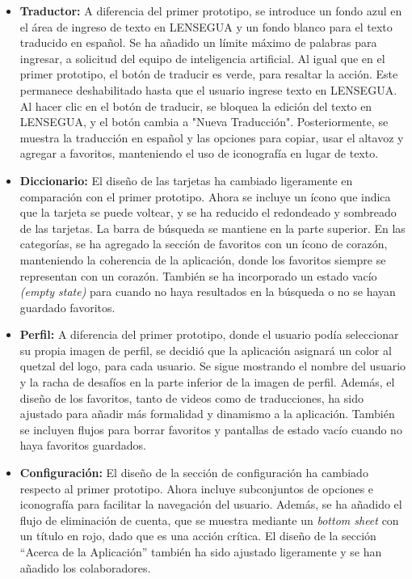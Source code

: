 \begin{itemize}
    \item \textbf{Traductor:} A diferencia del primer prototipo, se introduce un fondo azul en el área de ingreso de texto en LENSEGUA y un fondo blanco para el texto traducido en español. Se ha añadido un límite máximo de palabras para ingresar, a solicitud del equipo de inteligencia artificial. Al igual que en el primer prototipo, el botón de traducir es verde, para resaltar la acción. Este permanece deshabilitado hasta que el usuario ingrese texto en LENSEGUA. Al hacer clic en el botón de traducir, se bloquea la edición del texto en LENSEGUA, y el botón cambia a "Nueva Traducción". Posteriormente, se muestra la traducción en español y las opciones para copiar, usar el altavoz y agregar a favoritos, manteniendo el uso de iconografía en lugar de texto.

    \item \textbf{Diccionario:} El diseño de las tarjetas ha cambiado ligeramente en comparación con el primer prototipo. Ahora se incluye un ícono que indica que la tarjeta se puede voltear, y se ha reducido el redondeado y sombreado de las tarjetas. La barra de búsqueda se mantiene en la parte superior. En las categorías, se ha agregado la sección de favoritos con un ícono de corazón, manteniendo la coherencia de la aplicación, donde los favoritos siempre se representan con un corazón. También se ha incorporado un estado vacío \textit{(empty state)} para cuando no haya resultados en la búsqueda o no se hayan guardado favoritos.

    \item \textbf{Perfil:} A diferencia del primer prototipo, donde el usuario podía seleccionar su propia imagen de perfil, se decidió que la aplicación asignará un color al quetzal del logo, para cada usuario. Se sigue mostrando el nombre del usuario y la racha de desafíos en la parte inferior de la imagen de perfil. Además, el diseño de los favoritos, tanto de videos como de traducciones, ha sido ajustado para añadir más formalidad y dinamismo a la aplicación. También se incluyen flujos para borrar favoritos y pantallas de estado vacío cuando no haya favoritos guardados.

    \item \textbf{Configuración:} El diseño de la sección de configuración ha cambiado respecto al primer prototipo. Ahora incluye subconjuntos de opciones e iconografía para facilitar la navegación del usuario. Además, se ha añadido el flujo de eliminación de cuenta, que se muestra mediante un \textit{bottom sheet} con un título en rojo, dado que es una acción crítica. El diseño de la sección ``Acerca de la Aplicación'' también ha sido ajustado ligeramente y se han añadido los colaboradores.


\end{itemize}
